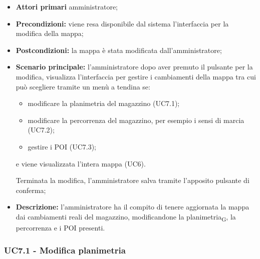\begin{itemize}

   \item   \textbf{Attori primari} amministratore;

  \item   \textbf{Precondizioni:} viene resa disponibile dal sistema l'interfaccia per la modifica della mappa;

   \item   \textbf{Postcondizioni:} la mappa è stata modificata dall'amministratore;

  \item   \textbf{Scenario principale:} l'amministratore dopo aver premuto il pulsante per la modifica, visualizza l'interfaccia per gestire i cambiamenti della mappa tra cui può scegliere tramite un menù a tendina se:

   \begin{itemize}
     \item modificare la planimetria del magazzino (UC7.1);

      \item modificare la percorrenza del magazzino, per esempio i sensi di marcia (UC7.2);

      \item gestire i POI (UC7.3);
  \end{itemize}

  e viene visualizzata l'intera mappa (UC6).

Terminata la modifica, l'amministratore salva tramite l'apposito pulsante di conferma;

 \item   \textbf{Descrizione:} l'amministratore ha il compito di tenere aggiornata la mappa dai cambiamenti reali del magazzino, modificandone la planimetria\textsubscript{G}, la percorrenza e i POI presenti.

\end{itemize}





\subsubsection{UC7.1 - Modifica planimetria}

